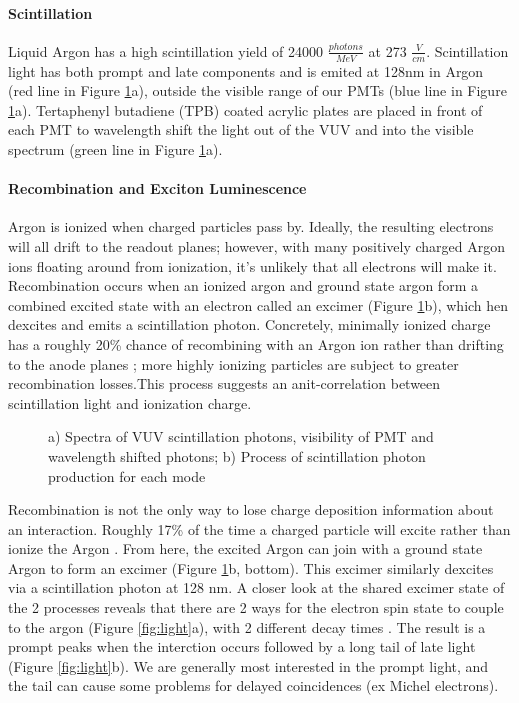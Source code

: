 \documentclass[12pt]{article}
\begin{document}
\paragraph{Scintillation}
\par Liquid Argon has a high scintillation yield of 24000 $\frac{photons}{MeV}$ at 273 $\frac{V}{cm}$.  Scintillation light has both prompt and late components and is emited at 128nm in Argon (red line in Figure \ref{fig:decay}a), outside the visible range of our PMTs (blue line in Figure \ref{fig:decay}a). Tertaphenyl butadiene (TPB) coated acrylic plates are placed in front of each PMT to wavelength shift the light out of the VUV and into the visible spectrum (green line in Figure \ref{fig:decay}a). 

\paragraph{Recombination and Exciton Luminescence}

\par Argon is ionized when charged particles pass by. Ideally, the resulting electrons will all drift to the readout planes; however, with many positively charged Argon ions floating around from ionization, it's unlikely that all electrons will make it. Recombination occurs when an ionized argon and ground state argon form a combined excited state with an electron called an excimer (Figure \ref{fig:decay}b), which hen dexcites and emits a scintillation photon. Concretely, minimally ionized charge has a roughly 20\% chance of recombining with an Argon ion rather than drifting to the anode planes \cite{bib:sorel}; more highly ionizing particles are subject to greater recombination losses.This process suggests an anit-correlation between scintillation light and ionization charge.

\begin{figure}[h!]
\centering
{}
\hspace{1 mm}
\caption{ a) Spectra of VUV scintillation photons, visibility of PMT and wavelength shifted photons; b) Process of scintillation photon production for each mode  } 
\label{fig:decay}
\end{figure}


\par Recombination is not the only way to lose charge deposition information about an interaction. Roughly 17\% of the time a charged particle will excite rather than ionize the Argon \cite{bib:sorel}. From here, the excited Argon can join with a ground state Argon to form an excimer (Figure \ref{fig:decay}b, bottom). This excimer similarly dexcites via a scintillation photon at 128 nm.  A closer look at the shared excimer state of the 2 processes reveals that there are 2 ways for the electron spin state to couple to the argon (Figure \ref{fig:light}a), with 2 different decay times \cite{bib:lumin}. The result is a prompt peaks when the interction occurs followed by a long tail of late light (Figure \ref{fig:light}b). We are generally most interested in the prompt light, and the tail can cause some problems for delayed coincidences (ex Michel electrons).
\end{document}
